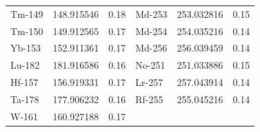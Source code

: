 \begin{tabular}{@{}lrr@{\hspace{1.6em}}lrr@{}}
Tm-149 & 148.915546 & 0.18 & Md-253 & 253.032816 & 0.15 \\
Tm-150 & 149.912565 & 0.17 & Md-254 & 254.035216 & 0.14 \\
Yb-153 & 152.911361 & 0.17 & Md-256 & 256.039459 & 0.14 \\
Lu-182 & 181.916586 & 0.16 & No-251 & 251.033886 & 0.15 \\
Hf-157 & 156.919331 & 0.17 & Lr-257 & 257.043914 & 0.14 \\
Ta-178 & 177.906232 & 0.16 & Rf-255 & 255.045216 & 0.14 \\
W-161 & 160.927188 & 0.17 & & & \\
\bottomrule
\end{tabular}
